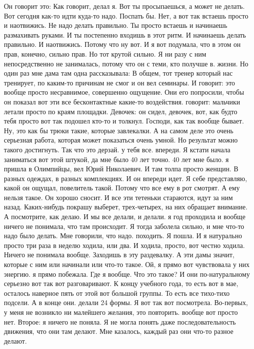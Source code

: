 Он говорит это:
Как говорит, делал я.
Вот ты просыпаешься, а может не делать.
Вот сегодня как-то идти куда-то надо.
Поспать бы.
Нет, а вот так встаешь просто и наотвижись.
Не надо делать правильно.
Ты просто встаешь и начинаешь размахивать руками.
И ты постепенно входишь в этот ритм.
И начинаешь делать правильно.
И наотвижись.
Потому что ну вот.
И я вот подумала, что в этом он прав, конечно, сильно прав.
Но тот крутой сильно.
Я ни разу с ним непосредственно не занималась, потому что он
с теми, кто получше в.
жизни.
Но один раз мне дама там одна рассказывала:
В общем, тот тренер который нас тренирует, по каким-то причинам не смог и он вел семинары.
И говорит: это вообще просто несравнимое, совершенно ощущение.
Они его попросили, чтобы он показал вот эти все бесконтактные какие-то воздействия.
говорит: мальчики летали просто по краям площадки.
Девочек: он сидел, девочек, вот, как будто тебя просто вот так подошел кто-то и толкнул.
Господи, как так вообще бывает.
Ну, это как бы трюки такие, которые завлекалки.
А на самом деле это очень серьезная работа, которая может показаться очень умной.
Но результат можно такого достигнуть.
Так что это дерзай.
у тебя все.
впереди.
Я кстати начала заниматься вот этой штукой, да мне было 40 лет точно.
40 лет мне было. я пришла в Олимпийцы, вел Юрий Николаевич.
И там толпа просто женщин.
В разных одеждах, в разных комплекциях.
И он впереди идет.
Я себе представляю, какой он ощущал, повелитель такой.
Потому что все ему в рот смотрят.
А ему нельзя такое.
Он хорошо сносит.
И все эти тетеньки стараются, идут за ним назад.
Каких-нибудь покрашу выберет, трех-четырех, на них обращает внимание.
А посмотрите, как делаю.
И мы все делали, и делали. я год проходила и вообще ничего не понимала, что там происходит.
Я тогда заболела сильно, и мне что-то надо было делать.
Мне говорили, что надо.
походить.
Я пошла.
И я натурально просто три раза в неделю ходила, или два.
И ходила, просто, вот честно ходила.
Ничего не понимала вообще.
Заходишь в эту раздевалку.
А эти дамы значит, которые с ним или начинали или что-то такое.
Ой, я прямо вот чувствовала у них энергию. я прямо побежала.
Где я вообще.
Что это такое?
И они по-натуральному серьезно вот так вот разговаривают.
К концу учебного года, то есть вот в мае, осталось наверное пять от этой вот большой группы.
То есть все тихо-тихо подсели.
А в конце они.
делали 24 формы.
Я вот так вот посмотрела.
Во-первых, у меня не возникло ни малейшего желания, это повторить. вообще вот просто нет.
Второе: я ничего не поняла.
Я не могла понять даже последовательность движения, что они там делают.
Мне казалось, каждый раз они что-то разное делают.
